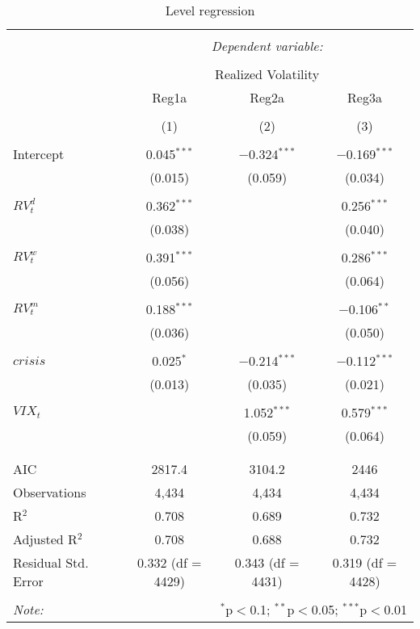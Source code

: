 
\begin{table}[!htbp] \centering 
  \caption{Level regression} 
  \label{} 
\begin{tabular}{@{\extracolsep{5pt}}lccc} 
\\[-1.8ex]\hline 
\hline \\[-1.8ex] 
 & \multicolumn{3}{c}{\textit{Dependent variable:}} \\ 
\cline{2-4} 
\\[-1.8ex] & \multicolumn{3}{c}{Realized Volatility} \\ 
 & Reg1a & Reg2a & Reg3a \\ 
\\[-1.8ex] & (1) & (2) & (3)\\ 
\hline \\[-1.8ex] 
 Intercept & 0.045$^{***}$ & $-$0.324$^{***}$ & $-$0.169$^{***}$ \\ 
  & (0.015) & (0.059) & (0.034) \\ 
  & & & \\ 
 $RV^{d}_{t}$ & 0.362$^{***}$ &  & 0.256$^{***}$ \\ 
  & (0.038) &  & (0.040) \\ 
  & & & \\ 
 $RV^{w}_{t}$ & 0.391$^{***}$ &  & 0.286$^{***}$ \\ 
  & (0.056) &  & (0.064) \\ 
  & & & \\ 
 $RV^{m}_{t}$ & 0.188$^{***}$ &  & $-$0.106$^{**}$ \\ 
  & (0.036) &  & (0.050) \\ 
  & & & \\ 
 $crisis$ & 0.025$^{*}$ & $-$0.214$^{***}$ & $-$0.112$^{***}$ \\ 
  & (0.013) & (0.035) & (0.021) \\ 
  & & & \\ 
 $VIX_{t}$ &  & 1.052$^{***}$ & 0.579$^{***}$ \\ 
  &  & (0.059) & (0.064) \\ 
  & & & \\ 
\hline \\[-1.8ex] 
AIC & 2817.4 & 3104.2 & 2446 \\ 
Observations & 4,434 & 4,434 & 4,434 \\ 
R$^{2}$ & 0.708 & 0.689 & 0.732 \\ 
Adjusted R$^{2}$ & 0.708 & 0.688 & 0.732 \\ 
Residual Std. Error & 0.332 (df = 4429) & 0.343 (df = 4431) & 0.319 (df = 4428) \\ 
\hline 
\hline \\[-1.8ex] 
\textit{Note:}  & \multicolumn{3}{r}{$^{*}$p$<$0.1; $^{**}$p$<$0.05; $^{***}$p$<$0.01} \\ 
\end{tabular} 
\end{table} 
